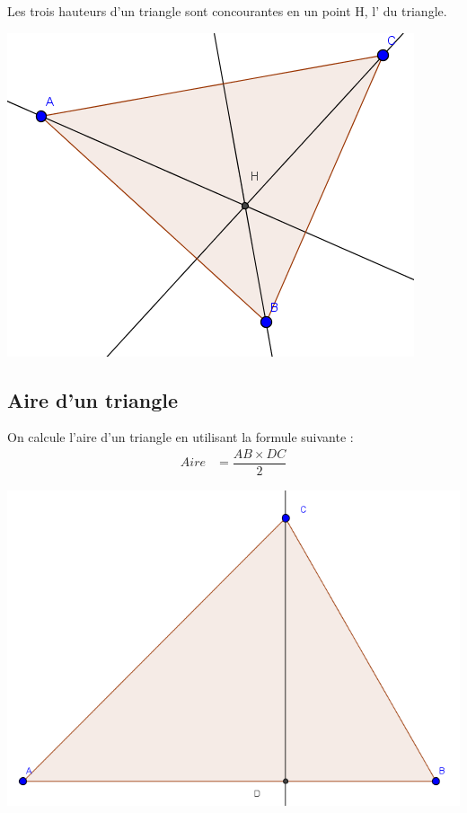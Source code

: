 \documentclass[12pt,a4paper]{article}
\begin{document}
\begin{myprop}
	
	\begin{multicols}{2}
		
		Les trois hauteurs d'un triangle sont concourantes en un point H, l'  du triangle. 
		
		\begin{center}
			\includegraphics[scale=0.4]{./img/hauteurs}
		\end{center} 
	\end{multicols}
\end{myprop}


\subsection{Aire d'un triangle}

\begin{mymeth}
	\begin{multicols}{2}
		On calcule l'aire d'un triangle en utilisant la formule suivante :
		\begin{align*}
			Aire &= \dfrac{AB \times DC}{2}
		\end{align*}
		
		\includegraphics[scale=0.4]{./img/aire-tri}
	\end{multicols}
\end{mymeth}
\end{document}
